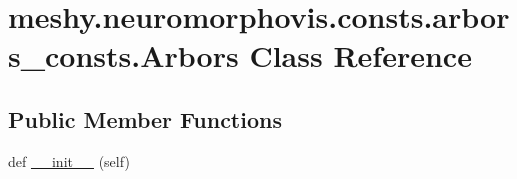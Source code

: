 \hypertarget{classmeshy_1_1neuromorphovis_1_1consts_1_1arbors__consts_1_1Arbors}{}\section{meshy.\+neuromorphovis.\+consts.\+arbors\+\_\+consts.\+Arbors Class Reference}
\label{classmeshy_1_1neuromorphovis_1_1consts_1_1arbors__consts_1_1Arbors}


 


\subsection*{Public Member Functions}
\begin{DoxyCompactItemize}
\item 
def \hyperlink{classmeshy_1_1neuromorphovis_1_1consts_1_1arbors__consts_1_1Arbors_a7eab8f149ae91328ff4c4baa9431cf6f}{\+\_\+\+\_\+init\+\_\+\+\_\+} (self)\hypertarget{classmeshy_1_1neuromorphovis_1_1consts_1_1arbors__consts_1_1Arbors_a7eab8f149ae91328ff4c4baa9431cf6f}{}\label{classmeshy_1_1neuromorphovis_1_1consts_1_1arbors__consts_1_1Arbors_a7eab8f149ae91328ff4c4baa9431cf6f}

\end{DoxyCompactItemize}
